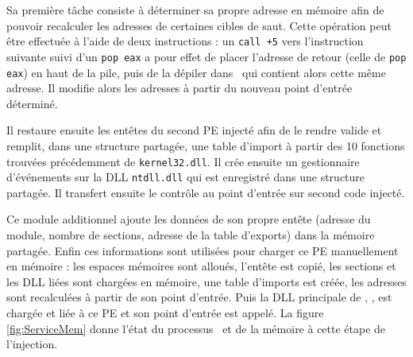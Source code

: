 Sa première tâche consiste à déterminer sa propre adresse en mémoire afin de pouvoir recalculer les adresses de certaines cibles de saut.
Cette opération peut être effectuée à l'aide de deux instructions : un \texttt{call +5} vers l'instruction suivante suivi d'un \texttt{pop eax} a pour effet de placer l'adresse de retour (celle de \texttt{pop eax}) en haut de la pile, puis de la dépiler dans \eax\ qui contient alors cette même adresse.
Il modifie alors les adresses à partir du nouveau point d'entrée déterminé.

Il restaure ensuite les entêtes du second PE injecté afin de le rendre valide et remplit, dans une structure partagée, une table d'import à partir des 10 fonctions trouvées précédemment de \texttt{kernel32.dll}.
Il crée ensuite un gestionnaire d’événements sur la DLL \texttt{ntdll.dll} qui est enregistré dans une structure partagée.
Il transfert ensuite le contrôle au point d'entrée sur second code injecté.

Ce module additionnel ajoute les données de son propre entête (adresse du module, nombre de sections, adresse de la table d'exports) dans la mémoire partagée.
Enfin ces informations sont utilisées pour charger ce PE manuellement en mémoire : les espaces mémoires sont alloués, l'entête est copié, les sections et les DLL liées sont chargées en mémoire, une table d'imports est créée, les adresses sont recalculées à partir de son point d'entrée.
Puis la DLL principale de \duqu, \netpDLL, est chargée et liée à ce PE et son point d'entrée est appelé.
La figure \ref{fig:ServiceMem} donne l'état du processus \services\ et de la mémoire à cette étape de l'injection.


